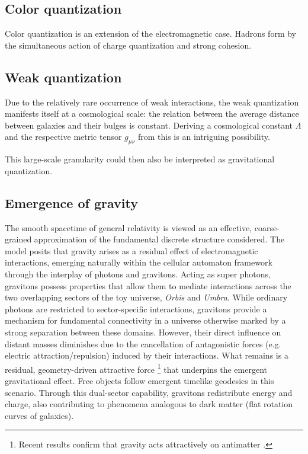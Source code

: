 \documentclass[12pt,english]{article}
\begin{document}
\subsection{Color quantization}
Color quantization is an extension of the electromagnetic case. Hadrons form by the simultaneous action of charge quantization and strong cohesion.

\subsection{Weak quantization}
Due to the relatively rare occurrence of weak interactions, the weak quantization manifests itself at a cosmological scale: the relation between the average distance between galaxies and their bulges is constant. Deriving a cosmological constant $\Lambda$ and the respective metric tensor $g_{\mu\nu}$ from this is an intriguing possibility. 

This large-scale granularity could then also be interpreted as gravitational quantization.

\subsection{Emergence of gravity}\label{subsec:emergence-of-gravity}

 The smooth spacetime of general relativity is viewed as an effective, coarse-grained approximation of the fundamental discrete structure considered. The model posits that gravity arises as a residual effect of electromagnetic interactions, emerging naturally within the cellular automaton framework through the interplay of photons and gravitons. Acting as super photons, gravitons possess properties that allow them to mediate interactions across the two overlapping sectors of the toy universe, \emph{Orbis} and \emph{Umbra}. While ordinary photons are restricted to sector-specific interactions, gravitons provide a mechanism for fundamental connectivity in a universe otherwise marked by a strong separation between these domains. However, their direct influence on distant masses diminishes due to the cancellation of antagonistic forces (e.g. electric attraction/repulsion) induced by their interactions. What remains is a residual, geometry-driven attractive force \footnote{Recent results confirm that gravity acts attractively on antimatter \cite{anderson2023observation}.} that underpins the emergent gravitational effect. Free objects follow emergent timelike geodesics in this scenario. Through this dual-sector capability, gravitons redistribute energy and charge, also contributing to phenomena analogous to dark matter (flat rotation curves of galaxies).
\end{document}
